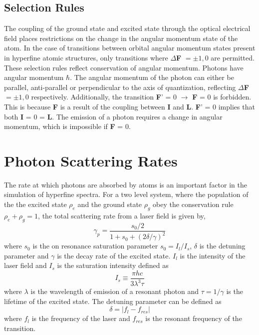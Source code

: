 \documentclass[12pt,a4paper,margin=1in]{report}
\begin{document}
\subsection{Selection Rules}
The coupling of the ground state and excited state through the optical electrical field places restrictions on the change in the angular momentum state of the atom. In the case of transitions between orbital angular momentum states present in hyperfine atomic structures, only transitions where $\Delta$\textbf{F}  $=\pm1,0$ are permitted. These selection rules reflect conservation of angular momentum. Photons have angular momentum $\hbar$. The angular momentum of the photon can either be parallel, anti-parallel or perpendicular to the axis of quantization, reflecting $\Delta$\textbf{F}$=\pm1,0$ respectively. Additionally, the transition \textbf{F}' = 0 $\rightarrow$ \textbf{F} = 0 is forbidden. This is because \textbf{F} is a result of the coupling between \textbf{I} and \textbf{L}. \textbf{F}' = 0 implies that both \textbf{I} = 0 = \textbf{L}. The emission of a photon requires a change in angular momentum, which is impossible if \textbf{F} = 0.

\section{Photon Scattering Rates}
The rate at which photons are absorbed by atoms is an important factor in the simulation of hyperfine spectra. For a two level system, where the population of the the excited state $\rho_{e}$ and the ground state $\rho_{g}$ obey the conservation rule $\rho_e +\rho_g = 1$, the total scattering rate from a laser field is given by,
\begin{equation}
\gamma_p =  \frac{s_0/2}{1+s_0+(2\delta/\gamma)^2}
\end{equation}
where $s_0$ is the on resonance saturation parameter $s_0 = I_l/I_s$, $\delta$ is the detuning parameter and $\gamma$ is the decay rate of the excited state. $I_l$ is the intensity of the laser field and $I_s$ is the saturation intensity defined as
\begin{equation}
I_s \equiv \frac{\pi h c}{3 \lambda^3 \tau}
\end{equation}
where $\lambda$ is the wavelength of emission of a resonant photon and $\tau = 1/\gamma$ is the lifetime of the excited state. The detuning parameter can be defined as
\begin{equation}
\delta =|f_{l} - f_{res}|
\end{equation}
where $f_l$ is the frequency of the laser and $f_{res}$ is the resonant frequency of the transition.
\end{document}
